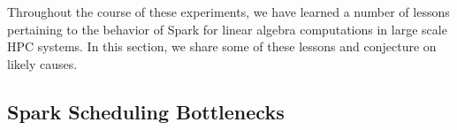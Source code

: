 Throughout the course of these experiments, we have learned a number of lessons pertaining to the behavior of Spark for linear algebra computations in large scale HPC systems. 
In this section, we share some of these lessons and conjecture on likely causes.
\subsection{Spark Scheduling Bottlenecks}

\begin{table}[th]
\begin{center}
\end{center}
\caption{Spark scheduling delays}
\label{tab:scheduling}
\end{table}
